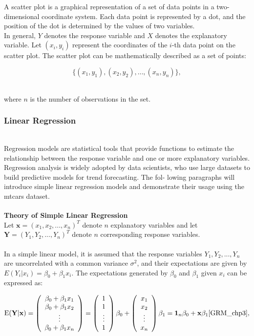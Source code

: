 \documentclass{article}\usepackage[]{graphicx}\usepackage[]{xcolor}
\begin{document}
A scatter plot is a graphical representation of a set of data points in a two-dimensional coordinate system. Each data point is represented by a dot, and the position of the dot is determined by the values of two variables.\\

\noindent
In general, \(Y\) denotes the response variable and \(X\) denotes the explanatory variable. Let \((x_i, y_i)\) represent the coordinates of the \(i\)-th data point on the scatter plot. The scatter plot can be mathematically described as a set of points:

\[ \{(x_1, y_1), (x_2, y_2), \ldots, (x_n, y_n)\}, \]
  
\\
\noindent where \(n\) is the number of observations in the set.\\


\subsubsection{Linear Regression}
\\Regression models are statistical tools that provide functions to estimate the relationship between the response variable and one or more explanatory variables. Regression analysis is widely adopted by data scientists, who use large datasets to build predictive models for trend forecasting. The fol- lowing paragraphs will introduce simple linear regression models and demonstrate their usage using the mtcars dataset.
\\  
\\   
\noindent
\textbf{Theory of Simple Linear Regression}
\\Let $\mathbf{x} = (x_1, x_2, ..., x_n)^T$ denote $n$ explanatory variables and let $\mathbf{Y} = (Y_1,Y_2,...,Y_n)^T$ denote $n$ corresponding response variables.
\\  
\\In a simple linear model, it is assumed that the response variables $Y_1,Y_2,...,Y_n$ are uncorrelated with a common variance $\sigma^2$, and their expectations are given by $E(Y_i| x_i) = \beta_0 + \beta_1 x_i$. The expectations generated by $\beta_0$ and $\beta_1$ given $x_i$ can be expressed as:

$$\mathrm{E}(\mathbf{Y} | \mathbf{x}) =
\left( \begin{array}{ccc}
\beta_0+\beta_1 x_1\\
\beta_0+\beta_1 x_2\\
\vdots\\
\beta_0+\beta_1 x_n
\end{array} \right) = 
\left( \begin{array}{ccc}
1\\
1\\
\vdots\\
1
\end{array} \right) \beta_0 + 
\left( \begin{array}{ccc}
x_1\\
x_2\\
\vdots\\
x_n
\end{array} \right) \beta_1 =
\mathbf{1}_n \beta_0 + \mathbf{x} \beta_1 \cite{GRM_chp3},
$$ 
\end{document}
